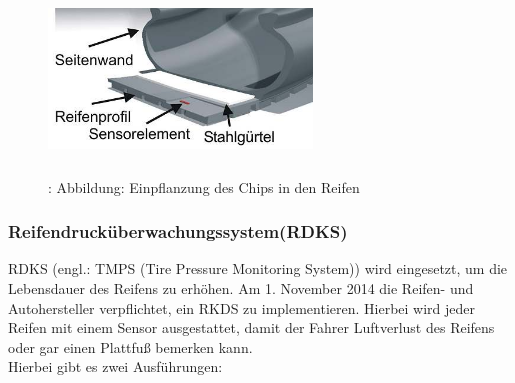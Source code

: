 				\begin{figure}
					\centering
					\includegraphics[width=7cm, height=5cm] {reifensensor.png}
					\caption {\cite{TS19}: Abbildung: Einpflanzung des Chips in den Reifen}
				\end{figure}
			
			
			\subsubsection{Reifendrucküberwachungssystem(RDKS)}
				RDKS (engl.: TMPS (Tire Pressure Monitoring System)) wird eingesetzt, um die Lebensdauer des Reifens zu erhöhen. Am 1. November 2014 die Reifen- und Autohersteller verpflichtet, ein RKDS zu implementieren. Hierbei wird jeder Reifen mit einem Sensor ausgestattet, damit der Fahrer Luftverlust des Reifens oder gar einen Plattfuß bemerken kann.\\
				Hierbei gibt es zwei Ausführungen:
				
